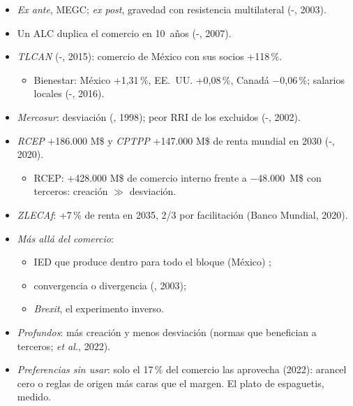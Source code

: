 \documentclass{article}
\begin{document}
\begin{columnas}
\begin{itemize}
\item \emph{Ex ante}, MEGC; \emph{ex post}, gravedad con resistencia multilateral (-, 2003).
\item Un ALC duplica el comercio en 10~años (-, 2007).
\end{itemize}
\begin{itemize}
\item \emph{TLCAN} (-, 2015): comercio de México con sus socios +118\,\%.
  \begin{itemize}
  \item Bienestar: México +1,31\,\%, EE.~UU. +0,08\,\%, Canadá $-$0,06\,\%; salarios locales (-, 2016).
  \end{itemize}
\item \emph{Mercosur}: desviación (, 1998); peor RRI de los excluidos (-, 2002).
\item \emph{RCEP} +186.000 M\$ y \emph{CPTPP} +147.000 M\$ de renta mundial en 2030 (-, 2020).
  \begin{itemize}
  \item RCEP: +428.000 M\$ de comercio interno frente a $-$48.000~M\$ con terceros: creación $\gg$ desviación.
  \end{itemize}
\item \emph{ZLECAf}: +7\,\% de renta en 2035, 2/3 por facilitación (Banco Mundial, 2020).
\item \emph{Más allá del comercio}:
  \begin{itemize}
  \item IED que produce dentro para todo el bloque (México) ;
  \item convergencia o divergencia (, 2003);
  \item \emph{Brexit}, el experimento inverso.
  \end{itemize}
\item \emph{Profundos}: más creación y menos desviación (normas que benefician a terceros;  \emph{et al.}, 2022).
\item \emph{Preferencias sin usar}: solo el 17\,\% del comercio las aprovecha (2022): arancel cero o reglas de origen más caras que el margen. El plato de espaguetis, medido.
\end{itemize}

\end{columnas}
\end{document}
